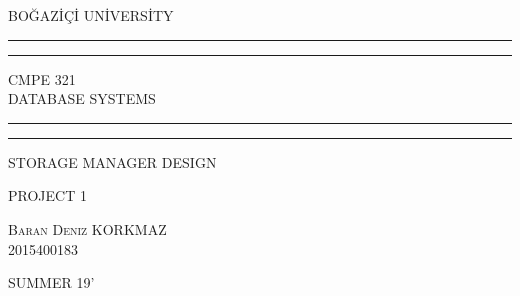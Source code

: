 \documentclass[12pt]{article}
\begin{document}
\begin{titlepage}
\centering
	
	\scshape
	
	\vspace*{6\baselineskip}
	
	{\scshape\Large BOĞAZİÇİ UNİVERSİTY\\} %
	
	\vspace*{4\baselineskip}
	
	
	\rule{\textwidth}{1.6pt}\vspace*{-\baselineskip}\vspace*{2pt}
	\rule{\textwidth}{0.4pt}
	
	\vspace{0.5\baselineskip}
	
	{\LARGE CMPE 321\\ DATABASE SYSTEMS\\} %
	
	\vspace{0.75\baselineskip} %
	
	\rule{\textwidth}{0.4pt}\vspace*{-\baselineskip}\vspace{3.2pt} %
	\rule{\textwidth}{1.6pt} %
	
	\vspace{2\baselineskip} %
	
	
	STORAGE MANAGER DESIGN %
	
	\vspace*{1\baselineskip} %
	
	
	PROJECT 1
	
	\vspace{3\baselineskip} %
	
	{\scshape\Large Baran Deniz KORKMAZ\\} %
	{\scshape\Large 2015400183\\} %
	
	\vspace{6\baselineskip} %
	\textsc{\large SUMMER 19'}


\end{titlepage}
\end{document}

